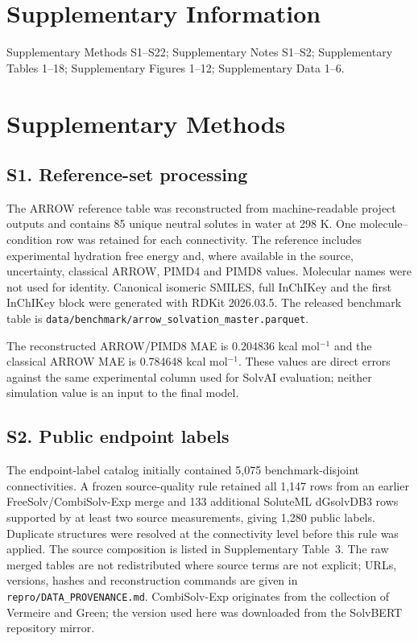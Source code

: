 \section*{Supplementary Information}
\noindent Supplementary Methods S1--S22; Supplementary Notes S1--S2;
 Supplementary Tables 1--18; Supplementary Figures 1--12; Supplementary Data 1--6.

\section*{Supplementary Methods}

\subsection*{S1. Reference-set processing}

The ARROW reference table was reconstructed from machine-readable project outputs and
contains 85 unique neutral solutes in water at 298 K. One molecule--condition row was
retained for each connectivity. The reference includes experimental hydration free
energy and, where available in the source, uncertainty, classical ARROW, PIMD4 and
PIMD8 values. Molecular names were not used for identity. Canonical isomeric SMILES,
full InChIKey and the first InChIKey block were generated with RDKit 2026.03.5. The
released benchmark table is \texttt{data/benchmark/arrow\_solvation\_master.parquet}.

The reconstructed ARROW/PIMD8 MAE is 0.204836 kcal mol$^{-1}$ and the classical
ARROW MAE is 0.784648 kcal mol$^{-1}$. These values are direct errors against the same
experimental column used for SolvAI evaluation; neither simulation value is an input
to the final model.

\subsection*{S2. Public endpoint labels}

The endpoint-label catalog initially contained 5,075 benchmark-disjoint
connectivities. A frozen source-quality rule retained all 1,147 rows from an earlier
FreeSolv/CombiSolv-Exp merge and 133 additional SoluteML dGsolvDB3 rows supported by
at least two source measurements, giving 1,280 public labels. Duplicate structures
were resolved at the connectivity level before this rule was applied. The source
composition is listed in Supplementary Table~3. The raw merged tables are not
redistributed where source terms are not explicit; URLs, versions, hashes and
reconstruction commands are given in \texttt{repro/DATA\_PROVENANCE.md}.
CombiSolv-Exp originates from the collection of Vermeire and Green;\cite{combisolv2021}
the version used here was downloaded from the SolvBERT repository mirror.\cite{combisolvexp2022}

